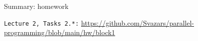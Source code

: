 \begin{frame}{Summary: homework}

\texttt{Lecture 2, Tasks 2.*:} {\tiny\url{https://github.com/Svazars/parallel-programming/blob/main/hw/block1}}

\end{frame}




% 
% 
% 
% 



